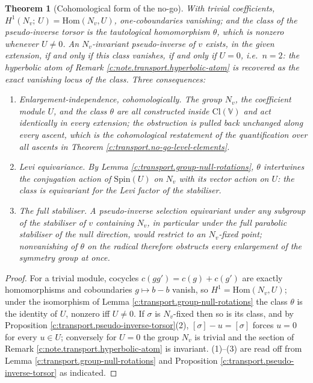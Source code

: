 \documentclass[11pt]{article}
\newtheorem{theorem}{Theorem}[section]
\theoremstyle{definition}
\theoremstyle{plain}
\providecommand{\Cl}{}\renewcommand{\Cl}{\mathrm{Cl}}
\providecommand{\Spin}{}\renewcommand{\Spin}{\mathrm{Spin}}
\begin{document}
\begin{theorem}[Cohomological form of the no-go]\label{c:transport.cohomological-form-no-go}
With trivial coefficients, $H^1(N_v;\, U) = \mathrm{Hom}(N_v, U)$, one-coboundaries vanishing; and the class of the pseudo-inverse torsor is the tautological homomorphism $\theta$, which is nonzero whenever $U \neq 0$. An $N_v$-invariant pseudo-inverse of $v$ exists, in the given extension, if and only if this class vanishes, if and only if $U = 0$, i.e.\ $n = 2$: the hyperbolic atom of Remark \ref{c:note.transport.hyperbolic-atom} is recovered as the exact vanishing locus of the class. Three consequences:
\begin{enumerate}
\item \emph{Enlargement-independence, cohomologically.} The group $N_v$, the coefficient module $U$, and the class $\theta$ are all constructed inside $\Cl(\mathbb{V})$ and act identically in every extension; the obstruction is pulled back unchanged along every ascent, which is the cohomological restatement of the quantification over all ascents in Theorem \ref{c:transport.no-go-level-elements}.
\item \emph{Levi equivariance.} By Lemma \ref{c:transport.group-null-rotations}, $\theta$ intertwines the conjugation action of $\Spin(U)$ on $N_v$ with its vector action on $U$: the class is equivariant for the Levi factor of the stabiliser.
\item \emph{The full stabiliser.} A pseudo-inverse selection equivariant under any subgroup of the stabiliser of $v$ containing $N_v$, in particular under the full parabolic stabiliser of the null direction, would restrict to an $N_v$-fixed point; nonvanishing of $\theta$ on the radical therefore obstructs every enlargement of the symmetry group at once.
\end{enumerate}
\end{theorem}
\begin{proof}
For a trivial module, cocycles $c(gg') = c(g) + c(g')$ are exactly homomorphisms and coboundaries $g \mapsto b - b$ vanish, so $H^1 = \mathrm{Hom}(N_v, U)$; under the isomorphism of Lemma \ref{c:transport.group-null-rotations} the class $\theta$ is the identity of $U$, nonzero iff $U \neq 0$. If $\sigma$ is $N_v$-fixed then so is its class, and by Proposition \ref{c:transport.pseudo-inverse-torsor}(2), $[\sigma] - u = [\sigma]$ forces $u = 0$ for every $u \in U$; conversely for $U = 0$ the group $N_v$ is trivial and the section of Remark \ref{c:note.transport.hyperbolic-atom} is invariant. (1)--(3) are read off from Lemma \ref{c:transport.group-null-rotations} and Proposition \ref{c:transport.pseudo-inverse-torsor} as indicated.

\end{proof}
\end{document}

